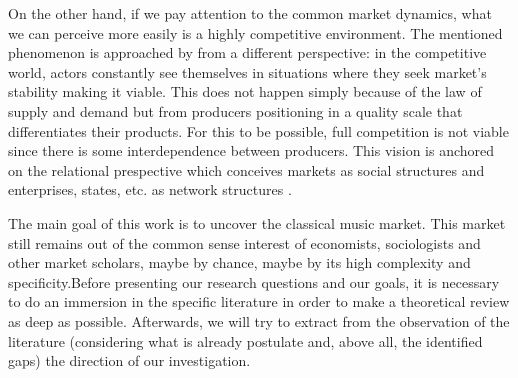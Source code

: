 \documentclass[a4paper, 12pt, openright, oneside, german, french, brazil, english, article]{abntex2}
\begin{document}
	On the other hand, if we pay attention to the common market dynamics, what we can perceive more easily is a highly competitive environment. The mentioned phenomenon is approached by  from a different perspective: in the competitive world, actors constantly see themselves in situations where they seek market's stability making it viable. This does not happen simply because of the law of supply and demand but from producers positioning in a quality scale that differentiates their products. For this to be possible, full competition is not viable since there is some interdependence between producers. This vision is anchored on the relational prespective which conceives markets as social structures and enterprises, states, etc. as network structures \cite{white2008,white2002markets,lazega2014redes}.


	
	The main goal of this work is to uncover the classical music market. This market still remains out of the common sense interest of economists, sociologists and other market scholars, maybe by chance, maybe by its high complexity and specificity.Before presenting our research questions and our goals, it is necessary to do an immersion in the specific literature in order to make a theoretical review as deep as possible. Afterwards, we will try to extract from the observation of the literature (considering what is already postulate and, above all, the identified gaps) the direction of our investigation.
\end{document}
